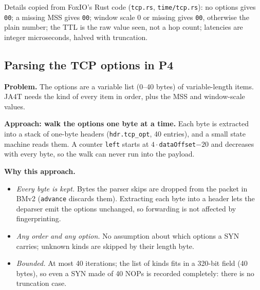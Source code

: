 \documentclass[11pt,a4paper]{article}
\newcommand{\code}[1]{\texttt{#1}}
\begin{document}
Details copied from FoxIO's Rust code (\code{tcp.rs}, \code{time/tcp.rs}): no options gives \code{00}; a missing MSS
gives \code{00}; window scale 0 or missing gives \code{00}, otherwise the plain number; the TTL is the raw value seen,
not a hop count; latencies are integer microseconds, halved with truncation.

\subsection{Parsing the TCP options in P4}

\textbf{Problem.} The options are a variable list (0--40 bytes) of variable-length items. JA4T needs the kind of
every item in order, plus the MSS and window-scale values.

\textbf{Approach: walk the options one byte at a time.} Each byte is extracted into a stack of one-byte headers
(\code{hdr.tcp\_opt}, 40 entries), and a small state machine reads them. A counter \code{left} starts at
$4\cdot$\code{dataOffset}$-20$ and decreases with every byte, so the walk can never run into the payload.

\textbf{Why this approach.}
\begin{itemize}
\item \emph{Every byte is kept.} Bytes the parser skips are dropped from the packet in BMv2 (\code{advance}
  discards them). Extracting each byte into a header lets the deparser emit the options unchanged, so forwarding is
  not affected by fingerprinting.
\item \emph{Any order and any option.} No assumption about which options a SYN carries; unknown kinds are skipped by
  their length byte.
\item \emph{Bounded.} At most 40 iterations; the list of kinds fits in a 320-bit field (40 bytes), so even a SYN made
  of 40 NOPs is recorded completely: there is no truncation case.
\end{itemize}
\end{document}

